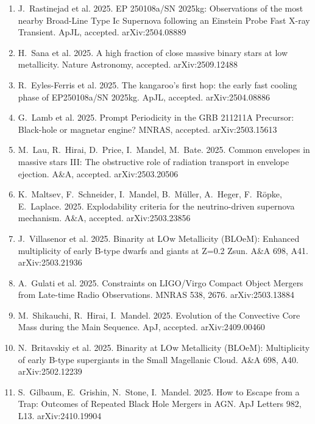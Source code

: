 \documentclass[margin,line]{res}
\begin{document}
\begin{resume}
\begin{enumerate}
\item J.~Rastinejad et al.  2025. EP 250108a/SN 2025kg: Observations of the most nearby Broad-Line Type Ic Supernova following an Einstein Probe Fast X-ray Transient.  ApJL, accepted. arXiv:2504.08889

\item H.~Sana et al.  2025.  A high fraction of close massive binary stars at low metallicity.  Nature Astronomy, accepted.  arXiv:2509.12488

\item R.~Eyles-Ferris et al. 2025. The kangaroo's first hop: the early fast cooling phase of EP250108a/SN 2025kg.  ApJL, accepted.  arXiv:2504.08886

\item G.~Lamb et al. 2025.  Prompt Periodicity in the GRB 211211A Precursor: Black-hole or magnetar engine?  MNRAS, accepted.  arXiv:2503.15613

\item M.~Lau, R.~Hirai, D.~Price, I.~Mandel, M.~Bate.  2025.  Common envelopes in massive stars III: The obstructive role of radiation transport in envelope ejection.  A\&A, accepted.  arXiv:2503.20506  

\item K.~Maltsev, F.~Schneider, I.~Mandel, B.~M\"{u}ller, A.~Heger, F.~R\"{o}pke, E.~Laplace. 2025.  Explodability criteria for the neutrino-driven supernova mechanism.  A\&A, accepted.  arXiv:2503.23856

\item J.~Villasenor et al. 2025. Binarity at LOw Metallicity (BLOeM): Enhanced multiplicity of early B-type dwarfs and giants at Z=0.2 Zsun.  A\&A 698, A41.  arXiv:2503.21936 

\item A.~Gulati et al.  2025.  Constraints on LIGO/Virgo Compact Object  Mergers from Late-time Radio Observations.  MNRAS 538, 2676. arXiv:2503.13884 

\item M.~Shikauchi, R.~Hirai, I.~Mandel. 2025. Evolution of the Convective Core Mass during the Main Sequence.  ApJ, accepted.  arXiv:2409.00460

\item N.~Britavskiy et al.  2025. Binarity at LOw Metallicity (BLOeM): Multiplicity of early B-type supergiants in the Small Magellanic Cloud.    A\&A 698, A40.  arXiv:2502.12239

\item S.~Gilbaum, E.~Grishin, N.~Stone, I.~Mandel.   2025. How to Escape from a Trap: Outcomes of Repeated Black Hole Mergers in AGN.  ApJ Letters 982, L13.  arXiv:2410.19904


\end{enumerate}
\end{resume}
\end{document}
